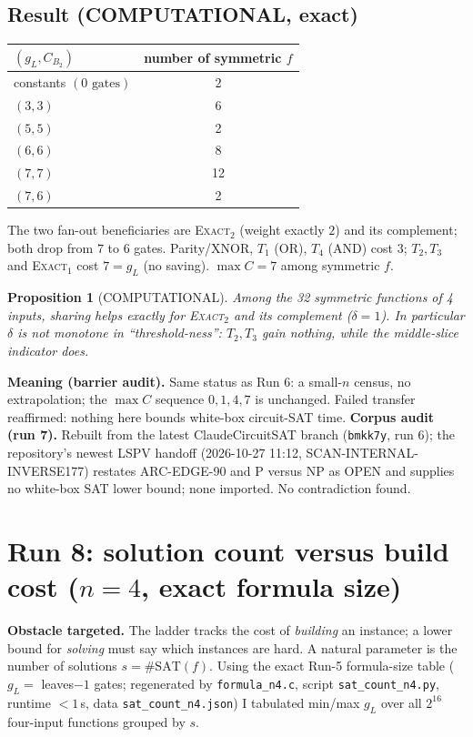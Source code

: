\documentclass[11pt]{article}
\newtheorem{prop}{Proposition}
\begin{document}
\subsection{Result (COMPUTATIONAL, exact)}
\begin{center}\begin{tabular}{@{}lc@{}}\toprule
$(g_L,C_{B_2})$ & number of symmetric $f$\\\midrule
constants $(0\text{ gates})$ & 2\\ $(3,3)$ & 6\\ $(5,5)$ & 2\\ $(6,6)$ & 8\\ $(7,7)$ & 12\\ $(7,6)$ & 2\\\bottomrule\end{tabular}\end{center}
The two fan-out beneficiaries are \textsc{Exact}$_2$ (weight exactly $2$) and its complement; both drop from $7$ to $6$ gates. Parity/XNOR, $T_1$ (OR), $T_4$ (AND) cost $3$; $T_2,T_3$ and \textsc{Exact}$_1$ cost $7=g_L$ (no saving). $\max C=7$ among symmetric $f$.
\begin{prop}[COMPUTATIONAL] Among the 32 symmetric functions of 4 inputs, sharing helps exactly for \textsc{Exact}$_2$ and its complement ($\delta=1$). In particular $\delta$ is not monotone in ``threshold-ness'': $T_2,T_3$ gain nothing, while the middle-slice indicator does.
\end{prop}
\textbf{Meaning (barrier audit).} Same status as Run 6: a small-$n$ census, no extrapolation; the $\max C$ sequence $0,1,4,7$ is unchanged. Failed transfer reaffirmed: nothing here bounds white-box circuit-SAT time. \textbf{Corpus audit (run 7).} Rebuilt from the latest ClaudeCircuitSAT branch (\texttt{bmkk7y}, run 6); the repository's newest LSPV handoff (2026-10-27 11:12, SCAN-INTERNAL-INVERSE177) restates ARC-EDGE-90 and P versus NP as OPEN and supplies no white-box SAT lower bound; none imported. No contradiction found.

\section{Run 8: solution count versus build cost ($n=4$, exact formula size)}\label{sec:r8}
\textbf{Obstacle targeted.} The ladder tracks the cost of \emph{building} an instance; a lower bound for \emph{solving} must say which instances are hard. A natural parameter is the number of solutions $s=\#\mathrm{SAT}(f)$. Using the exact Run-5 formula-size table ($g_L=$ leaves$-1$ gates; regenerated by \texttt{formula\_n4.c}, script \texttt{sat\_count\_n4.py}, runtime $<1$\,s, data \texttt{sat\_count\_n4.json}) I tabulated min/max $g_L$ over all $2^{16}$ four-input functions grouped by $s$.
\end{document}
